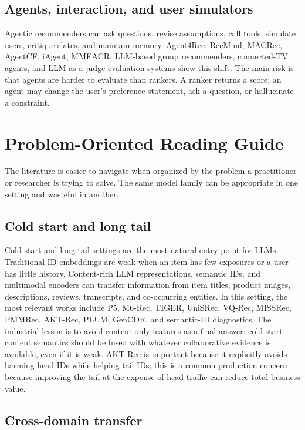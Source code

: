 \documentclass[11pt]{article}
\begin{document}
\subsection{Agents, interaction, and user simulators}

Agentic recommenders can ask questions, revise assumptions, call tools, simulate users, critique slates, and maintain memory. Agent4Rec, RecMind, MACRec, AgentCF, iAgent, MMEACR, LLM-based group recommenders, connected-TV agents, and LLM-as-a-judge evaluation systems show this shift. The main risk is that agents are harder to evaluate than rankers. A ranker returns a score; an agent may change the user's preference statement, ask a question, or hallucinate a constraint.

\section{Problem-Oriented Reading Guide}

The literature is easier to navigate when organized by the problem a practitioner or researcher is trying to solve. The same model family can be appropriate in one setting and wasteful in another.

\subsection{Cold start and long tail}

Cold-start and long-tail settings are the most natural entry point for LLMs. Traditional ID embeddings are weak when an item has few exposures or a user has little history. Content-rich LLM representations, semantic IDs, and multimodal encoders can transfer information from item titles, product images, descriptions, reviews, transcripts, and co-occurring entities. In this setting, the most relevant works include P5, M6-Rec, TIGER, UniSRec, VQ-Rec, MISSRec, PMMRec, AKT-Rec, PLUM, GenCDR, and semantic-ID diagnostics. The industrial lesson is to avoid content-only features as a final answer: cold-start content semantics should be fused with whatever collaborative evidence is available, even if it is weak. AKT-Rec is important because it explicitly avoids harming head IDs while helping tail IDs; this is a common production concern because improving the tail at the expense of head traffic can reduce total business value.

\subsection{Cross-domain transfer}
\end{document}
